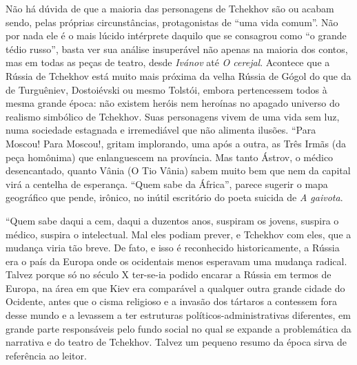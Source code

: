 Não há dúvida de que a maioria das personagens de Tchekhov são ou acabam
sendo, pelas próprias circunstâncias, protagonistas de ``uma vida
comum''. Não por nada ele é o mais lúcido intérprete daquilo que se
consagrou como ``o grande tédio russo'', basta ver sua análise
insuperável não apenas na maioria dos contos, mas em todas as peças de
teatro, desde \emph{Ivánov} até \emph{O cerejal}. Acontece que a Rússia
de Tchekhov está muito mais próxima da velha Rússia de Gógol do que da
de Turguêniev, Dostoiévski ou mesmo Tolstói, embora pertencessem todos à
mesma grande época: não existem heróis nem heroínas no apagado universo
do realismo simbólico de Tchekhov. Suas personagens vivem de uma vida
sem luz, numa sociedade estagnada e irremediável que não alimenta
ilusões. ``Para Moscou! Para Moscou!, gritam implorando, uma após a
outra, as Três Irmãs (da peça homônima) que enlanguescem na província.
Mas tanto Ástrov, o médico desencantado, quanto Vânia (O Tio Vânia)
sabem muito bem que nem da capital virá a centelha de esperança. ``Quem
sabe da África'', parece sugerir o mapa geográfico que pende, irônico,
no inútil escritório do poeta suicida de \emph{A gaivota}.

``Quem sabe daqui a cem, daqui a duzentos anos, suspiram os jovens,
suspira o médico, suspira o intelectual. Mal eles podiam prever, e
Tchekhov com eles, que a mudança viria tão breve. De fato, e isso é
reconhecido historicamente, a Rússia era o país da Europa onde os
ocidentais menos esperavam uma mudança radical. Talvez porque só no
século X ter-se-ia podido encarar a Rússia em termos de Europa, na área
em que Kiev era comparável a qualquer outra grande cidade do Ocidente,
antes que o cisma religioso e a invasão dos tártaros a contessem fora
desse mundo e a levassem a ter estruturas políticos-administrativas
diferentes, em grande parte responsáveis pelo fundo social no qual se
expande a problemática da narrativa e do teatro de Tchekhov. Talvez um
pequeno resumo da época sirva de referência ao leitor.

